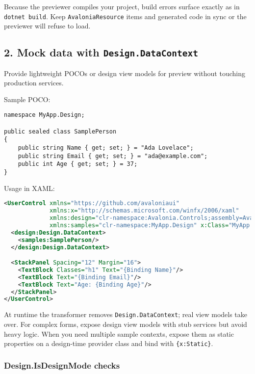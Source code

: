 Because the previewer compiles your project, build errors surface
exactly as in \passthrough{\lstinline!dotnet build!}. Keep
\passthrough{\lstinline!AvaloniaResource!} items and generated code in
sync or the previewer will refuse to load.

\subsection{\texorpdfstring{2. Mock data with
\texttt{Design.DataContext}}{2. Mock data with Design.DataContext}}\label{mock-data-with-design.datacontext}

Provide lightweight POCOs or design view models for preview without
touching production services.

Sample POCO:

\begin{lstlisting}
namespace MyApp.Design;

public sealed class SamplePerson
{
    public string Name { get; set; } = "Ada Lovelace";
    public string Email { get; set; } = "ada@example.com";
    public int Age { get; set; } = 37;
}
\end{lstlisting}

Usage in XAML:

\begin{lstlisting}[language=XML]
<UserControl xmlns="https://github.com/avaloniaui"
             xmlns:x="http://schemas.microsoft.com/winfx/2006/xaml"
             xmlns:design="clr-namespace:Avalonia.Controls;assembly=Avalonia.Controls"
             xmlns:samples="clr-namespace:MyApp.Design" x:Class="MyApp.Views.ProfileView">
  <design:Design.DataContext>
    <samples:SamplePerson/>
  </design:Design.DataContext>

  <StackPanel Spacing="12" Margin="16">
    <TextBlock Classes="h1" Text="{Binding Name}"/>
    <TextBlock Text="{Binding Email}"/>
    <TextBlock Text="Age: {Binding Age}"/>
  </StackPanel>
</UserControl>
\end{lstlisting}

At runtime the transformer removes
\passthrough{\lstinline!Design.DataContext!}; real view models take
over. For complex forms, expose design view models with stub services
but avoid heavy logic. When you need multiple sample contexts, expose
them as static properties on a design-time provider class and bind with
\passthrough{\lstinline!\{x:Static\}!}.

\subsubsection{Design.IsDesignMode
checks}\label{design.isdesignmode-checks}

